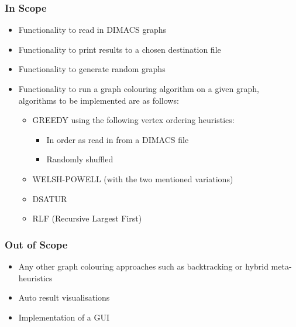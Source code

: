 \subsubsection{In Scope}
\begin{itemize}
    \item Functionality to read in DIMACS graphs
    \item Functionality to print results to a chosen destination file
    \item Functionality to generate random graphs
    \item Functionality to run a graph colouring algorithm on a given graph, algorithms to be implemented are as follows:
    \begin{itemize}
        \item GREEDY using the following vertex ordering heuristics:
        \begin{itemize}
            \item In order as read in from a DIMACS file
            \item Randomly shuffled 
        \end{itemize}
        \item WELSH-POWELL (with the two mentioned variations)
        \item DSATUR 
        \item RLF (Recursive Largest First) 
    \end{itemize}

\end{itemize}
\subsubsection{Out of Scope}
\begin{itemize}
    \item Any other graph colouring approaches such as backtracking or hybrid meta-heuristics
    \item Auto result visualisations 
    \item Implementation of a GUI
\end{itemize}

